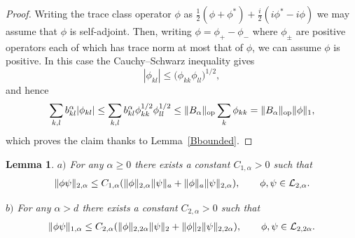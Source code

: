 \documentclass[11pt]{article}
\newtheorem{lemma}{Lemma}
\begin{document}
\begin{proof}
Writing the trace class operator $\phi$ as $\frac
12(\phi+\phi^*)+\frac i2(i\phi^*-i\phi)$ we may assume that $\phi$ is
self-adjoint. Then, writing $\phi= \phi_+-\phi_-$ where $\phi_\pm$ are positive
operators each of which has trace norm at most that of $\phi$, we can
assume $\phi$ is positive. In this case the Cauchy--Schwarz inequality
gives
\[
|\phi_{kl}|  \leq \big(\phi_{kk} \phi_{ll}\big)^{1/2},
\]
and hence
\begin{gather*}
\sum_{k,l}b_{kl}^{\alpha} |\phi_{kl}|\leq
\sum_{k,l}b_{kl}^{\alpha} \phi_{kk}^{1/2} \phi_{ll}^{1/2}
\leq \Vert B_{\alpha}\Vert_{\rm op} \sum_k\phi_{kk}
=\Vert B_{\alpha}\Vert_{\rm op} \Vert\phi\Vert_1 ,
\end{gather*}
which proves the claim thanks to Lemma~\ref{Bbounded}.
\end{proof}

\begin{lemma}\label{product}
$a)$  For any $\alpha\geq 0$ there exists a constant $C_{1,\alpha}>0$
such that
\begin{gather}\label{prodest1}
\Vert\phi \psi\Vert_{2,\alpha}\leq C_{1,\alpha}(\Vert\phi\Vert_{2,\alpha} \Vert\psi\Vert_a
+\Vert\phi\Vert_a \Vert\psi\Vert_{2,\alpha}),\qquad \phi, \psi\in {\cal L}_{2,\alpha} .
\end{gather}

$b)$  For any $\alpha> d$ there exists a constant $C_{2,\alpha}>0$
such that
\begin{gather}\label{prodest2}
\Vert\phi \psi\Vert_{1,\alpha}\leq C_{2,\alpha}(\Vert\phi\Vert_{2,2\alpha} \Vert\psi\Vert_2
+\Vert\phi\Vert_2 \Vert\psi\Vert_{2,2\alpha}),\qquad \phi,\psi\in {\cal L}_{2, 2\alpha} .
\end{gather}
\end{lemma}
\end{document}
